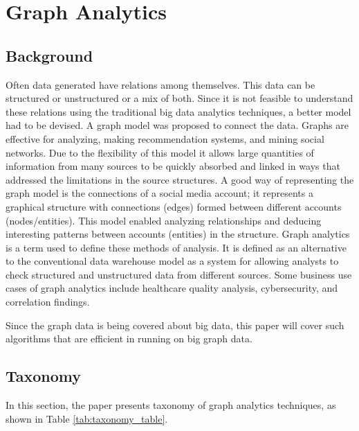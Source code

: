 \documentclass[journal,twoside,web]{ieeecolor}
\begin{document}
\section{Graph Analytics}
\label{sec:background}
\subsection{Background}
Often data generated have relations among themselves. This data can be structured or unstructured or a mix of both. Since it is not feasible to understand these relations using the traditional big data analytics techniques, a better model had to be devised. A graph model was proposed to connect the data. Graphs are effective for analyzing, making recommendation systems, and mining social networks. Due to the flexibility of this model it allows large quantities of information from many sources to be quickly absorbed and linked in ways that addressed the limitations in the source structures. A good way of representing the graph model is the connections of a social media account; it represents a graphical structure with connections (edges) formed between different accounts (nodes/entities). This model enabled analyzing relationships and deducing interesting patterns between accounts (entities) in the structure. Graph analytics is a term used to define these methods of analysis. It is defined as an alternative to the conventional data warehouse model as a system for allowing analysts to check structured and unstructured data from different sources. Some business use cases of graph analytics include healthcare quality analysis, cybersecurity, and correlation findings.

Since the graph data is being covered about big data, this paper will cover such algorithms that are efficient in running on big graph data.

\subsection{Taxonomy}
In this section, the paper presents taxonomy of graph analytics techniques, as shown in Table \ref{tab:taxonomy_table}.
\end{document}
